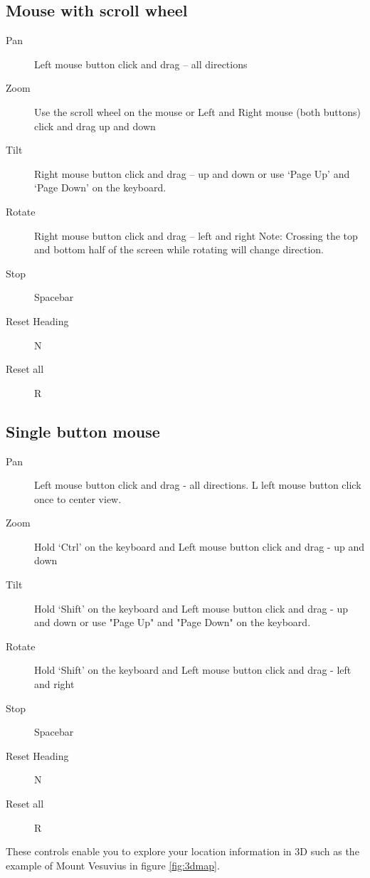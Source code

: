 \subsection{Mouse with scroll wheel}

\begin{description}
      \item[Pan] Left mouse button click and drag -- all directions
      \item[Zoom] Use the scroll wheel on the mouse or Left and Right mouse (both buttons) click and drag up and down
      \item[Tilt] Right mouse button click and drag -- up and down or use `Page Up' and `Page Down' on the keyboard.
      \item[Rotate] Right mouse button click and drag -- left and right Note: Crossing the top and bottom half of the screen while rotating will change direction.
      \item[Stop] Spacebar
      \item[Reset Heading] N
      \item[Reset all] R 
\end{description}


\subsection{Single button mouse}
\begin{description}
     \item[Pan] Left mouse button click and drag - all directions. L left mouse button click once to center view.
     \item[Zoom] Hold `Ctrl' on the keyboard and Left mouse button click and drag - up and down
     \item[Tilt] Hold `Shift' on the keyboard and Left mouse button click and drag - up and down or use "Page Up" and "Page Down" on the keyboard.
     \item[Rotate] Hold `Shift' on the keyboard and Left mouse button click and drag - left and right
     \item[Stop] Spacebar
     \item[Reset Heading] N
     \item[Reset all] R 
\end{description}


These controls enable you to explore your location information in 3D such as the example of Mount Vesuvius in figure \ref{fig:3dmap}.

